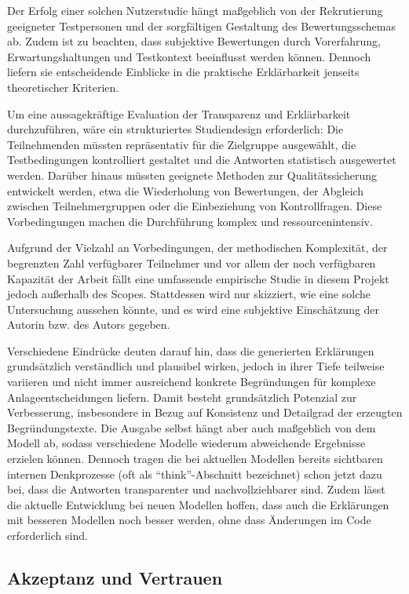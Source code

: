       Der Erfolg einer solchen Nutzerstudie hängt maßgeblich von der Rekrutierung geeigneter Testpersonen und der sorgfältigen Gestaltung des Bewertungsschemas ab.
      Zudem ist zu beachten, dass subjektive Bewertungen durch Vorerfahrung, Erwartungshaltungen und Testkontext beeinflusst werden können.
      Dennoch liefern sie entscheidende Einblicke in die praktische Erklärbarkeit jenseits theoretischer Kriterien.

      Um eine aussagekräftige Evaluation der Transparenz und Erklärbarkeit durchzuführen, wäre ein strukturiertes Studiendesign erforderlich:
      Die Teilnehmenden müssten repräsentativ für die Zielgruppe ausgewählt, die Testbedingungen kontrolliert gestaltet und die Antworten statistisch ausgewertet werden.
      Darüber hinaus müssten geeignete Methoden zur Qualitätssicherung entwickelt werden, etwa die Wiederholung von Bewertungen, der Abgleich zwischen Teilnehmergruppen oder die Einbeziehung von Kontrollfragen.
      Diese Vorbedingungen machen die Durchführung komplex und ressourcenintensiv.

      Aufgrund der Vielzahl an Vorbedingungen, der methodischen Komplexität, der begrenzten Zahl verfügbarer Teilnehmer und vor allem der noch verfügbaren Kapazität der Arbeit fällt eine umfassende empirische Studie in diesem Projekt jedoch außerhalb des Scopes. %
      Stattdessen wird nur skizziert, wie eine solche Untersuchung aussehen könnte, und es wird eine subjektive Einschätzung der Autorin bzw. des Autors gegeben.

      Verschiedene Eindrücke deuten darauf hin, dass die generierten Erklärungen grundsätzlich verständlich und plausibel wirken, jedoch in ihrer Tiefe teilweise variieren und nicht immer ausreichend konkrete Begründungen für komplexe Anlageentscheidungen liefern.
      Damit besteht grundsätzlich Potenzial zur Verbesserung, insbesondere in Bezug auf Konsistenz und Detailgrad der erzeugten Begründungstexte.
      Die Ausgabe selbst hängt aber auch maßgeblich von dem Modell ab, sodass verschiedene Modelle wiederum abweichende Ergebnisse erzielen können.
      Dennoch tragen die bei aktuellen Modellen bereits sichtbaren internen Denkprozesse (oft als \enquote{think}-Abschnitt bezeichnet) schon jetzt dazu bei, dass die Antworten transparenter und nachvollziehbarer sind.
      Zudem lässt die aktuelle Entwicklung bei neuen Modellen hoffen, dass auch die Erklärungen mit besseren Modellen noch besser werden, ohne dass Änderungen im Code erforderlich sind.

    \subsection{Akzeptanz und Vertrauen}

